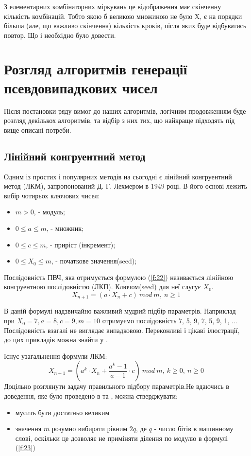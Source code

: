\documentclass[oneside,final,14pt]{extreport}
\begin{document}
\begin{large}
З елементарних комбінаторних міркувань це відображення має 
скінченну кількість комбінацій. Тобто якою б великою множиною 
не було X, є на порядки більша (але, що важливо скінченна) кількість 
кроків, після яких буде відбуватись повтор. Що і необхідно було довести.

\section{Розгляд алгоритмів генерації псевдовипадкових чисел}\label{s:23}
Після постановки ряду вимог до наших алгоритмів, логічним продовженням
 буде розгляд декількох алгоритмів, та відбір з них тих, що найкраще 
 підходять під вище описані потреби. 

\subsection{Лінійний конгруентний метод}\label{ss:231}
Одним із простих і популярних методів на сьогодні є лінійний конгруентний 
метод (ЛКМ), запропонований Д. Г. Лехмером в 1949 році. В його основі 
лежить вибір чотирьох ключових чисел:
\begin{itemize}
\item	\(m > 0\), - модуль;
\item  \(0 \leq a \leq m\), - множник;
\item  \(0 \leq c \leq m\), - приріст (інкремент);
\item  \(0 \leq X_0 \leq m\), - початкове значення(seed); 
\end{itemize}

Послідовність ПВЧ, яка отримується формулою (\ref{f:22}) називається лінійною 
конгруентною послідовністю (ЛКП). Ключом(seed) для неї слугує \(X_0\).
\begin{equation}
X_{n + 1} = (a \cdot X_n + c)\:mod \: m,\:n \geq 1 
\label{f:22}
\end{equation}

В даній формулі надзвичайно важливий мудрий підбір параметрів. Наприклад при
\(X_0 = 7, a = 8, c = 9, m =10\) отримуємо послідовність  7, 5, 9, 7, 5, 9, 1, ...
Послідовність взагалі не виглядає випадковою. Переконливі і
 цікаві ілюстрації, до цих прикладів можна знайти у \cite{b1}.

Існує узагальнення формули ЛКМ:
\begin{equation}
	X_{n + 1} = (a^k \cdot X_n + \frac{a^k - 1}{a - 1} \cdot c) \:mod \:m,\: k \geq 0,\: n \geq 0
	\label{f:23}	
\end{equation}
Доцільно розглянути задачу правильного підбору параметрів.Не вдаючись в доведення, 
яке було проведено в \cite{b1} та \cite{b3}, можна стверджувати: 
\begin{itemize}
	\item мусить бути достатньо великим
	\item значення $m$ розумно вибирати рівним $2q$, де $q$ - число 
	бітів в машинному слові, оскільки це дозволяє не приміняти 
	ділення по модулю в формулі (\ref{f:23})	 
\end{itemize}


\end{large}
\end{document}
